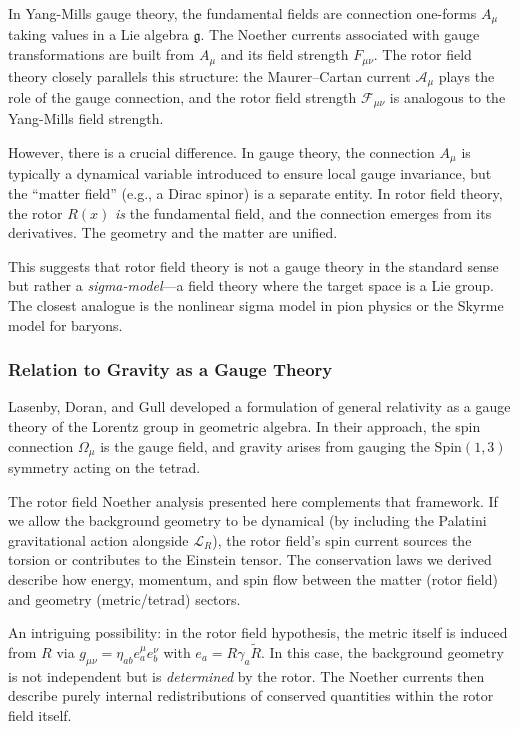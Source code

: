 \documentclass[11pt,a4paper]{article}
\numberwithin{equation}{section}
\theoremstyle{plain}
\theoremstyle{definition}
\theoremstyle{remark}
\begin{document}
In Yang-Mills gauge theory, the fundamental fields are connection one-forms $A_\mu$ taking values in a Lie algebra $\mathfrak{g}$. The Noether currents associated with gauge transformations are built from $A_\mu$ and its field strength $F_{\mu\nu}$. The rotor field theory closely parallels this structure: the Maurer--Cartan current $\mathcal{A}_\mu$ plays the role of the gauge connection, and the rotor field strength $\mathcal{F}_{\mu\nu}$ is analogous to the Yang-Mills field strength.

However, there is a crucial difference. In gauge theory, the connection $A_\mu$ is typically a dynamical variable introduced to ensure local gauge invariance, but the ``matter field'' (e.g., a Dirac spinor) is a separate entity. In rotor field theory, the rotor $R(x)$ \emph{is} the fundamental field, and the connection emerges from its derivatives. The geometry and the matter are unified.

This suggests that rotor field theory is not a gauge theory in the standard sense but rather a \emph{sigma-model}---a field theory where the target space is a Lie group. The closest analogue is the nonlinear sigma model in pion physics or the Skyrme model for baryons.

\subsubsection{Relation to Gravity as a Gauge Theory}

Lasenby, Doran, and Gull developed a formulation of general relativity as a gauge theory of the Lorentz group in geometric algebra. In their approach, the spin connection $\Omega_\mu$ is the gauge field, and gravity arises from gauging the $\mathrm{Spin}(1,3)$ symmetry acting on the tetrad.

The rotor field Noether analysis presented here complements that framework. If we allow the background geometry to be dynamical (by including the Palatini gravitational action alongside $\mathcal{L}_R$), the rotor field's spin current sources the torsion or contributes to the Einstein tensor. The conservation laws we derived describe how energy, momentum, and spin flow between the matter (rotor field) and geometry (metric/tetrad) sectors.

An intriguing possibility: in the rotor field hypothesis, the metric itself is induced from $R$ via $g_{\mu\nu} = \eta_{ab}e_a^\mu e_b^\nu$ with $e_a = R\gamma_a\widetilde{R}$. In this case, the background geometry is not independent but is \emph{determined} by the rotor. The Noether currents then describe purely internal redistributions of conserved quantities within the rotor field itself.
\end{document}
